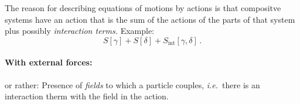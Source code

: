 \begin{note}
    The reason for describing equations of motions by actions is that compositve systems have
    an action that is the sum of the actions of the parts of that system plus possibly
    \textit{interaction terms.}
    Example:
    \begin{equation}
        S[\gamma] + S[\delta] + S_\text{int}[\gamma,\delta]\,.
    \end{equation}
\end{note}

\paragraph{With external forces:}
or rather: Presence of \textit{fields} to which a particle couples, \textit{i.e.}\ there
is an interaction therm with the field in the action.

